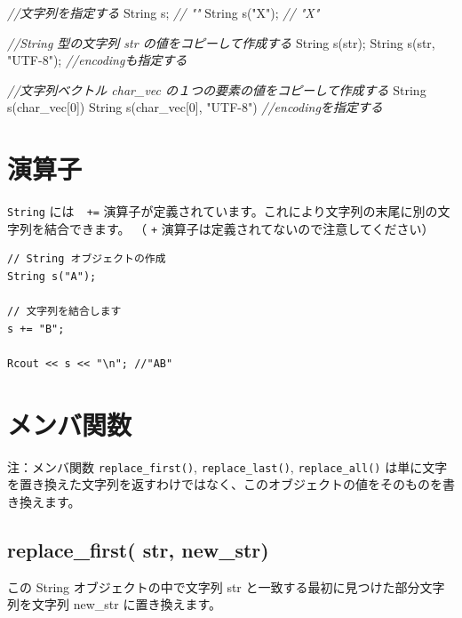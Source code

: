 \documentclass[]{book}
\newenvironment{Shaded}{\begin{snugshade}}{\end{snugshade}}
\newcommand{\CommentTok}[1]{\textcolor[rgb]{0.56,0.35,0.01}{\textit{#1}}}
\newcommand{\DecValTok}[1]{\textcolor[rgb]{0.00,0.00,0.81}{#1}}
\newcommand{\NormalTok}[1]{#1}
\newcommand{\StringTok}[1]{\textcolor[rgb]{0.31,0.60,0.02}{#1}}
\begin{document}
\begin{Shaded}
\begin{Highlighting}[]
\CommentTok{//文字列を指定する}
\NormalTok{String s;      }\CommentTok{// ""}
\NormalTok{String s(}\StringTok{"X"}\NormalTok{); }\CommentTok{// "X"}

\CommentTok{//String 型の文字列 str の値をコピーして作成する}
\NormalTok{String s(str);          }
\NormalTok{String s(str, }\StringTok{"UTF-8"}\NormalTok{); }\CommentTok{//encodingも指定する}

\CommentTok{//文字列ベクトル char_vec の１つの要素の値をコピーして作成する}
\NormalTok{String s(char_vec[}\DecValTok{0}\NormalTok{])}
\NormalTok{String s(char_vec[}\DecValTok{0}\NormalTok{], }\StringTok{"UTF-8"}\NormalTok{) }\CommentTok{//encodingを指定する}
\end{Highlighting}
\end{Shaded}

\section{演算子}

\texttt{String} には　\texttt{+=} 演算子が定義されています。これにより文字列の末尾に別の文字列を結合できます。 （ \texttt{+} 演算子は定義されてないので注意してください）

\begin{verbatim}
// String オブジェクトの作成
String s("A");

// 文字列を結合します
s += "B";

Rcout << s << "\n"; //"AB"
\end{verbatim}

\hypertarget{-2}{%
\section{メンバ関数}\label{-2}}

注：メンバ関数 \texttt{replace\_first()}, \texttt{replace\_last()}, \texttt{replace\_all()} は単に文字を置き換えた文字列を返すわけではなく、このオブジェクトの値をそのものを書き換えます。

\hypertarget{replace_first-str-new_str}{%
\subsection{replace\_first( str, new\_str)}\label{replace_first-str-new_str}}

この String オブジェクトの中で文字列 str と一致する最初に見つけた部分文字列を文字列 new\_str に置き換えます。
\end{document}
